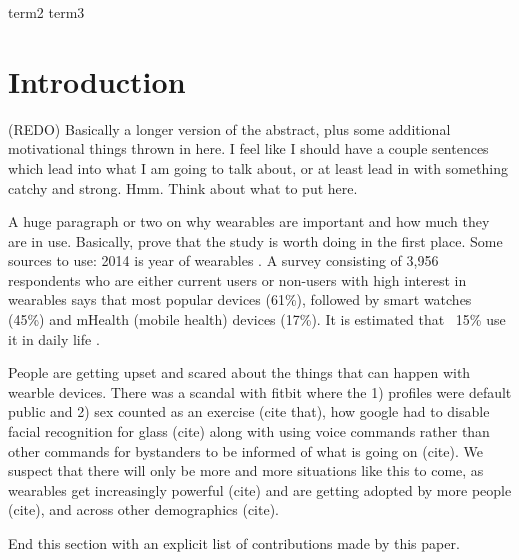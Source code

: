 \documentclass{acm_proc_article-sp}
\begin{document}
 {term2} {term3}



\section{Introduction}
(REDO) Basically a longer version of the abstract, plus some additional motivational things thrown in here. I feel like I should have a couple sentences which lead into what I am going to talk about, or at least lead in with something catchy and strong. Hmm. Think about what to put here.

A huge paragraph or two on why wearables are important and how much they are in use. Basically, prove that the study is worth doing in the first place. Some sources to use: 2014 is year of wearables \cite{Forbes}. A survey consisting of 3,956 respondents who are either current users or non-users with high interest in wearables \cite{Neilsen} says that most popular devices (61\%), followed by smart watches (45\%) and mHealth (mobile health) devices (17\%). It is estimated that ~15\% use it in daily life \cite{Nilsen}\cite{WearableStatNews}.

People are getting upset and scared about the things that can happen with wearble devices. There was a scandal with fitbit where the 1) profiles were default public and 2) sex counted as an exercise (cite that), how google had to disable facial recognition for glass (cite) along with using voice commands rather than other commands for bystanders to be informed of what is going on (cite). We suspect that there will only be more and more situations like this to come, as wearables get increasingly powerful (cite) and are getting adopted by more people (cite), and across other demographics (cite). 

End this section with an explicit list of contributions made by this paper. \\[-.8cm]
\end{document}
